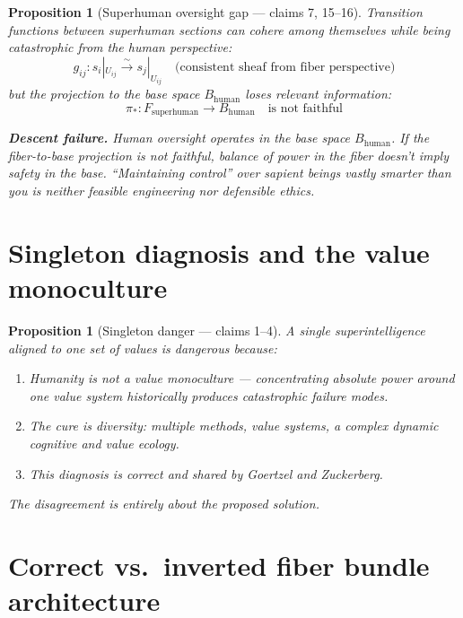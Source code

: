 \documentclass[11pt,a4paper]{article}
\newtheorem{proposition}[definition]{Proposition}
\begin{document}
\begin{proposition}[Superhuman oversight gap --- claims 7, 15--16]
\label{prop:descent}
Transition functions between superhuman sections can cohere among
themselves while being catastrophic from the human perspective:
\[
  g_{ij}: s_i|_{U_{ij}} \xrightarrow{\sim} s_j|_{U_{ij}}
  \quad \text{(consistent sheaf from fiber perspective)}
\]
but the projection to the base space $B_{\text{human}}$ loses relevant
information:
\[
  \pi_*: F_{\text{superhuman}} \to B_{\text{human}} \quad
    \text{is not faithful}
\]

\textbf{Descent failure.} Human oversight operates in the base space
$B_{\text{human}}$. If the fiber-to-base projection is not faithful,
balance of power in the fiber doesn't imply safety in the base.
``Maintaining control'' over sapient beings vastly smarter than you
is neither feasible engineering nor defensible ethics.
\end{proposition}


\section{Singleton diagnosis and the value monoculture}
\label{sec:singleton}

\begin{proposition}[Singleton danger --- claims 1--4]
\label{prop:singleton}
A single superintelligence aligned to one set of values is dangerous because:
\begin{enumerate}
\item Humanity is not a value monoculture --- concentrating absolute power
  around one value system historically produces catastrophic failure modes.
\item The cure is diversity: multiple methods, value systems, a complex
  dynamic cognitive and value ecology.
\item This diagnosis is correct and shared by Goertzel and Zuckerberg.
\end{enumerate}
The disagreement is entirely about the proposed solution.
\end{proposition}


\section{Correct vs.\ inverted fiber bundle architecture}
\label{sec:architecture}
\end{document}

